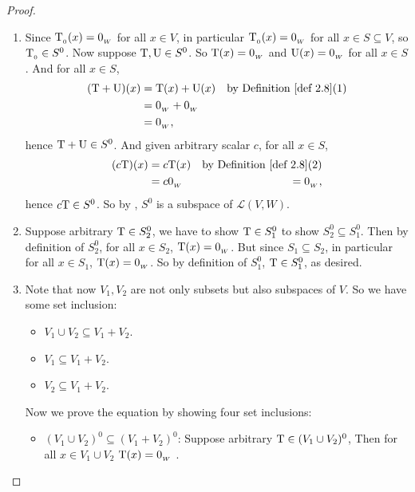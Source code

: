 \begin{proof} \ 
\begin{enumerate}
\item Since \(\mathrm{T}_{_0}(x) = 0_{_W}\) for all \(x \in V\), in particular \(\mathrm{T}_{_0}(x) = 0_{_W}\) for all \(x \in S \subseteq V\), so \(\mathrm{T}_{_0} \in S^0\).
    Now suppose \(\mathrm{T}, \mathrm{U} \in S^0\).
    So \(\mathrm{T}(x) = 0_{_W}\) and \(\mathrm{U}(x) = 0_{_W}\) for all \(x \in S\).
    And for all \(x \in S\),
    \begin{align*}
        (\T + \U)(x) & = \T(x) + \U(x) & \text{by \DEF{2.8}(1)} \\
                     & = \OW + \OW \\
                     & = \OW,
    \end{align*}
    hence \(\mathrm{T} + \mathrm{U} \in S^0\).
    And given arbitrary scalar \(c\), for all \(x \in S\),
    \begin{align*}
        (c\T)(x) & = c\T(x) & \text{by \DEF{2.8}(2)} \\
                     & = c\OW
                     & = \OW,
    \end{align*}
    hence \(c\mathrm{T}\in S^0\).
    So by , \(S^0\) is a subspace of \(\mathcal{L}(V, W)\).

\item Suppose arbitrary \(\mathrm{T} \in S^0_2\), we have to show \(\mathrm{T} \in S^0_1\) to show \(S^0_2 \subseteq S^0_1\).
Then by definition of \(S^0_2\), for all \(x \in S_2\), \(\mathrm{T}(x) = 0_{_W}\).
But since \(S_1 \subseteq S_2\), in particular for all \(x \in S_1\), \(\mathrm{T}(x) = 0_{_W}\).
So by definition of \(S^0_1\), \(\mathrm{T} \in S^0_1\), as desired.

\item Note that now \(V_1, V_2\) are not only subsets but also subspaces of \(V\).
So we have some set inclusion:
\begin{itemize}
    \item \(V_1 \cup V_2 \subseteq V_1 + V_2\).
    \item \(V_1 \subseteq V_1 + V_2\).
    \item \(V_2 \subseteq V_1 + V_2\).
\end{itemize}

Now we prove the equation by showing four set inclusions:
\begin{itemize}
    \item \((V_1 \cup V_2)^0 \subseteq (V_1 + V_2)^0\):
        Suppose arbitrary \(\mathrm{T} \in (V_1 \cup V_2)^0\),
        Then for all \(x \in V_1 \cup V_2\) \(\mathrm{T}(x) = 0_{_W}\) .
        

\end{itemize}
\end{enumerate}
\end{proof}
